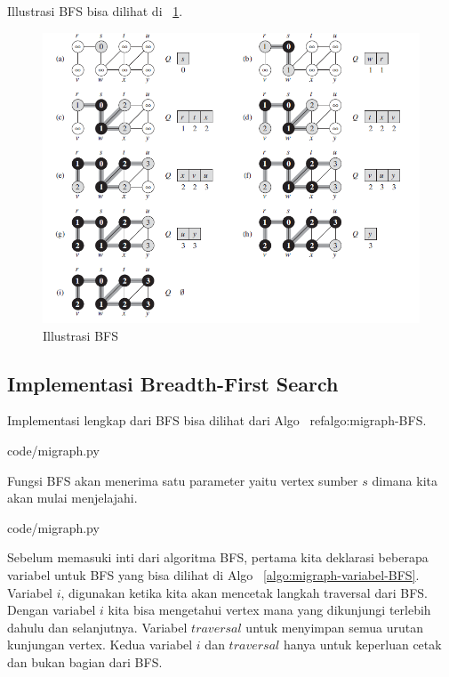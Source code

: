 Illustrasi BFS bisa dilihat di ~\ref{fig:BFS}.

\begin{figure}
    \includegraphics[width=\textwidth,keepaspectratio]{fig/BFS.png}%
	\caption{Illustrasi BFS}%
	\label{fig:BFS}%
\end{figure}

\subsection{Implementasi Breadth-First Search}

Implementasi lengkap dari BFS bisa dilihat dari Algo ~ref{algo:migraph-BFS}.


                {code/migraph.py}

Fungsi BFS akan menerima satu parameter yaitu vertex sumber $s$ dimana kita akan mulai menjelajahi.


                {code/migraph.py}

Sebelum memasuki inti dari algoritma BFS, pertama kita deklarasi beberapa variabel untuk BFS yang bisa dilihat di Algo ~\ref{algo:migraph-variabel-BFS}. Variabel $i$, digunakan ketika kita akan mencetak langkah traversal dari BFS. Dengan variabel $i$ kita bisa mengetahui vertex mana yang dikunjungi terlebih dahulu dan selanjutnya. Variabel $traversal$ untuk menyimpan semua urutan kunjungan vertex. Kedua variabel $i$ dan $traversal$ hanya untuk keperluan cetak dan bukan bagian dari BFS. 

